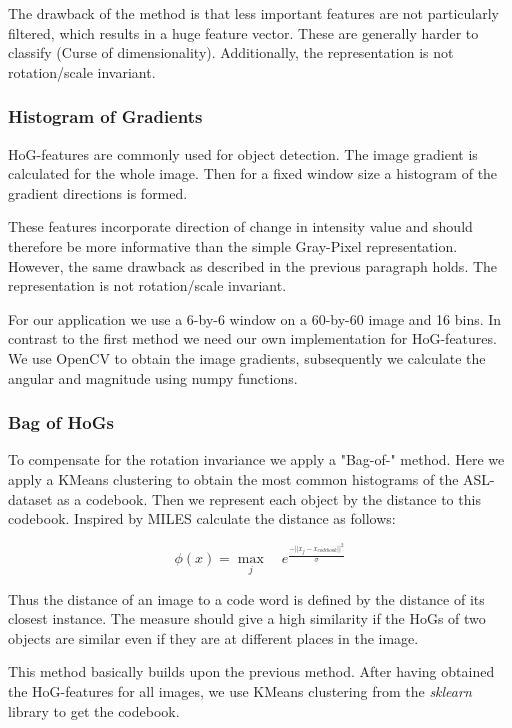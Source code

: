 \documentclass[letterpaper, 10 pt, conference]{ieeeconf}  %
\begin{document}
The drawback of the method is that less important features are not particularly filtered, which results in a huge feature vector. These are generally harder to classify (Curse of dimensionality). Additionally, the representation is not rotation/scale invariant.

\subsubsection{Histogram of Gradients}

HoG-features \cite{c1} are commonly used for object detection. The image gradient is calculated for the whole image. Then for a fixed window size a histogram of the gradient directions is formed.

These features incorporate direction of change in intensity value and should therefore be more informative than the simple Gray-Pixel representation. However, the same drawback as described in the previous paragraph holds. The representation is not rotation/scale invariant.

For our application we use a 6-by-6 window on a 60-by-60 image and 16 bins. In contrast to the first method we need our own implementation for HoG-features. We use OpenCV to obtain the image gradients, subsequently we calculate the angular and magnitude using numpy functions.

\subsubsection{Bag of HoGs}

To compensate for the rotation invariance we apply a "Bag-of-" method. Here we apply a KMeans clustering to obtain the most common histograms of the ASL-dataset as a codebook. Then we represent each object by the distance to this codebook. Inspired by MILES \cite{c2} calculate the distance as follows:

\begin{equation}
	\phi(x) = \max\limits_j\quad e^{\frac{-||x_j-x_{codebook}||^2}{\sigma}}
\end{equation}

Thus the distance of an image to a code word is defined by the distance of its closest instance. The measure should give a high similarity if the HoGs of two objects are similar even if they are at different places in the image.

This method basically builds upon the previous method. After having obtained the HoG-features for all images, we use KMeans clustering from the \textit{sklearn} library to get the codebook.
\end{document}
